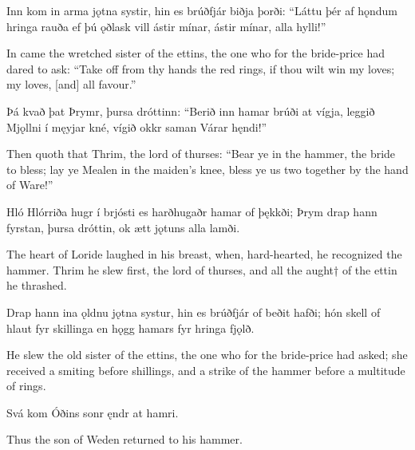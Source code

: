 Inn kom in arma \hld jǫtna systir,
hin es brúðfjár \hld biðja þorði:
“Láttu þér af hǫndum \hld hringa rauða
ef þú ǫðlask vill \hld ástir mínar,
ástir mínar, \hld alla hylli!”

In came the wretched sister of the ettins, the one who for the bride-price had dared to ask: “Take off from thy hands the red rings, if thou wilt win my loves; my loves, [and] all favour.”\footnotemark[1]

Þá kvað þat Þrymr, \hld þursa dróttinn:
“Berið inn hamar \hld brúði at vígja,
leggið Mjǫllni \hld í męyjar kné,
vígið okkr saman \hld Várar hęndi!”

Then quoth that Thrim, the lord of thurses: “Bear ye in the hammer, the bride to bless; lay ye Mealen in the maiden’s knee, bless ye us two together by the hand of Ware!\footnotemark[1]”

Hló Hlórriða \hld hugr í brjósti
es harðhugaðr \hld hamar of þękkði;
Þrym drap hann fyrstan, \hld þursa dróttin,
ok ætt jǫtuns \hld alla lamði. 

The heart of Loride laughed in his breast, when, hard-hearted, he recognized the hammer. Thrim he slew first, the lord of thurses, and all the aught† of the ettin he thrashed.

Drap hann ina ǫldnu \hld jǫtna systur,
hin es brúðfjár \hld of beðit hafði;
hón skell of hlaut \hld fyr skillinga
en hǫgg hamars \hld fyr hringa fjǫlð.

He slew the old sister of the ettins, the one who for the bride-price had asked; she received a smiting before shillings, and a strike of the hammer before a multitude of rings.

Svá kom Óðins sonr \hld ęndr at hamri. 

Thus the son of Weden returned to his hammer.
